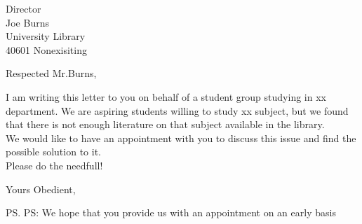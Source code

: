\documentclass[foldmarks=true, foldmarks=BHLVmtP,subject=titled,version=last]{scrlttr2} %
\begin{document}



\begin{letter}{Director\\
Joe Burns\\
University Library\\
40601 Nonexisiting\\ }

\opening{Respected Mr.Burns,}			%
I am writing this letter to you on behalf of a student group studying in xx department. We are aspiring students willing to study xx subject, but we found that there is not enough literature on that subject available in the library.\\
We would like to have an appointment with you to discuss this issue and find the possible solution to it.\\
Please do the needfull!
\closing{Yours Obedient,}				%
\ps PS: We hope that you provide us with an appointment on an early basis	%
\end{letter}


\end{document}
